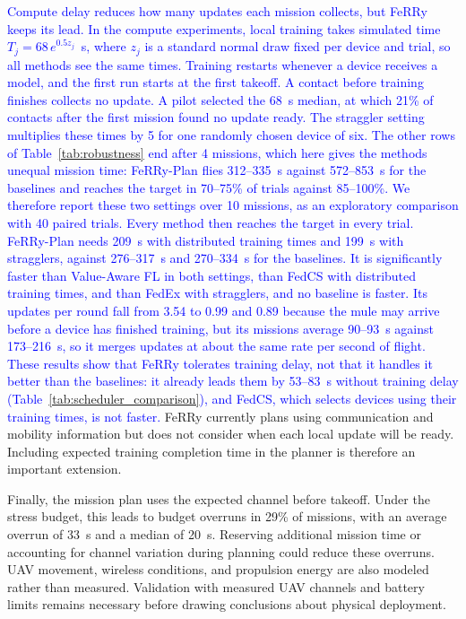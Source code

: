 \documentclass[conference]{IEEEtran}
\newcommand{\sysname}{FeRRy}
\begin{document}
\textcolor{blue}{Compute delay reduces how many updates each mission collects, but \sysname{}
keeps its lead. In the compute experiments, local training takes simulated time
$T_j=68\,e^{0.5z_j}$~s, where $z_j$ is a standard normal draw fixed per device and
trial, so all methods see the same times. Training restarts whenever a device
receives a model, and the first run starts at the first takeoff. A contact before
training finishes collects no update. A pilot selected the 68~s median, at which
21\% of contacts after the first mission found no update ready. The straggler
setting multiplies these times by 5 for one randomly chosen device of six.
The other rows of Table~\ref{tab:robustness} end after 4 missions, which here gives
the methods unequal mission time: \sysname{}-Plan flies 312--335~s against
572--853~s for the baselines and reaches the target in 70--75\% of trials against
85--100\%. We therefore report these two settings over 10 missions, as an
exploratory comparison with 40 paired trials. Every method then reaches the target
in every trial. \sysname{}-Plan needs 209~s with distributed training times and
199~s with stragglers, against 276--317~s and 270--334~s for the baselines. It is
significantly faster than Value-Aware FL in both settings, than FedCS with
distributed training times, and than FedEx with stragglers, and no baseline is
faster. Its updates per round fall from 3.54 to 0.99 and 0.89 because the mule may
arrive before a device has finished training, but its missions average 90--93~s
against 173--216~s, so it merges updates at about the same rate per second of
flight. These results show that \sysname{} tolerates training delay, not that it
handles it better than the baselines: it already leads them by 53--83~s without
training delay (Table~\ref{tab:scheduler_comparison}), and FedCS, which selects
devices using their training times, is not faster.}
\sysname{} currently plans using communication and mobility information but
does not consider when each local update will be ready. Including expected
training completion time in the planner is therefore an important extension.

Finally, the mission plan uses the expected channel before takeoff. Under the
stress budget, this leads to budget overruns in 29\% of missions, with an
average overrun of 33~s and a median of 20~s. Reserving additional mission time
or accounting for channel variation during planning could reduce these
overruns. UAV movement, wireless conditions, and propulsion energy are also
modeled rather than measured. Validation with measured UAV channels and battery
limits remains necessary before drawing conclusions about physical deployment.
\end{document}
